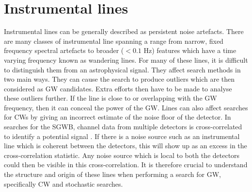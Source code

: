 \section{\label{detchar:lines}Instrumental lines}

%

Instrumental lines can be generally described as persistent noise
artefacts.  There are many classes of
instrumental line spanning a range from narrow, fixed frequency spectral
artefacts to broader ($<0.1$ Hz) features which have a time varying frequency
known as wandering lines.  For many of these lines, it is difficult to
distinguish them from an astrophysical signal.  They affect search methods in
two main ways.  They can cause the search to produce outliers which are then
considered as \gls{GW} candidates.  Extra efforts then have to be made to
analyse these outliers further.  If the line is close to or overlapping with the \gls{GW}
frequency, then it can conceal the power of the \gls{GW}. 
Lines can also affect searches for \glspl{CW} by giving an incorrect estimate of the noise floor of the detector.
In searches for the \gls{SGWB}, channel data from multiple detectors is cross-correlated to identify a potential signal \citep{allen1999DetectingStochastic}.
If there is a noise source such as an instrumental line which is coherent between the detectors, this will show up as an excess in the cross-correlation statistic\citep{covas2018IdentificationMitigation}.
Any noise source which is local to both the detectors could then be visible in this cross-correlation.
It is therefore crucial to understand the structure and origin of these lines when performing a search for
\gls{GW}, specifically \gls{CW} and stochastic searches.

%

